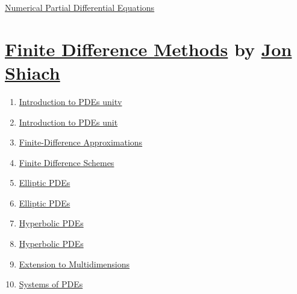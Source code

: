 \documentclass[11pt]{article}
\begin{document}
	\kaishu 
	\setcounter{section}{0}
	\begin{center}
		{\LARGE  \href{https://en.wikipedia.org/wiki/Numerical_methods_for_partial_differential_equations}{Numerical Partial Differential Equations}}
		
		
	\end{center}
\tableofcontents	
{\pagestyle{empty}\mbox{}\newpage\pagestyle{empty}}
\newpage 
\setcounter{page}{1}

\section[Finite Difference Methods]{\large {\href{https://www.youtube.com/playlist?list=PLgPpaTsP_3Dq5KsWd6-8wmjNs3ipnvCU3}{Finite Difference Methods}} by {\href{https://jonshiach.github.io/}{Jon Shiach}}}

\vspace{-0.5cm}

\begin{enumerate}
	\item \href{https://mp.weixin.qq.com/s/ix6b3RuE8jfu7ShyWCF8UQ}{Introduction to PDEs unitv}	%
	\item \href{https://mp.weixin.qq.com/s/tCxpaNM1BmIVMZfVclu--w}{Introduction to PDEs unit }	%
	\item \href{https://mp.weixin.qq.com/s/-NY0BtVqtIGHExZL5yoY7g}{Finite-Difference Approximations}	%
	\item \href{https://mp.weixin.qq.com/s/rcs5SKRaIDUtpv9Gs0VjIw}{Finite Difference Schemes}	%
	\item \href{https://mp.weixin.qq.com/s/Dk-uyz5RfBniCce6bdrkLQ}{Elliptic PDEs }	%
	\item \href{https://mp.weixin.qq.com/s/qsTc1B8vZX5VrRKnajF62g}{Elliptic PDEs }	%
	\item \href{https://mp.weixin.qq.com/s/8xukMKjB8bLrdiIgkI_2dQ}{Hyperbolic PDEs }	%
	\item \href{https://mp.weixin.qq.com/s/8tAzbTxm8gJBmnu21fccPw}{Hyperbolic PDEs }	%
	\item \href{https://mp.weixin.qq.com/s/t76wz9gXa_oMhqj2vQ9a4g}{Extension to Multidimensions}	%
	\item \href{https://mp.weixin.qq.com/s/46EyRd-LDzZG4R90S4IesA}{Systems of PDEs}	%
\end{enumerate}	
\end{document}
